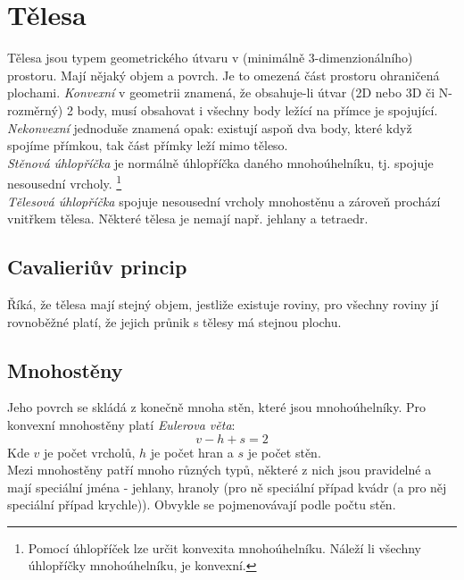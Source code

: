 \documentclass[12pt]{article}
\begin{document}
\section{Tělesa}
Tělesa jsou typem geometrického útvaru v (minimálně 3-dimenzionálního) prostoru. Mají nějaký objem a povrch. Je to omezená část prostoru ohraničená plochami. \emph{Konvexní} v geometrii znamená, že obsahuje-li útvar (2D nebo 3D či N-rozměrný) 2 body, musí obsahovat i všechny body ležící na přímce je spojující. \emph{Nekonvexní} jednoduše znamená opak: existují aspoň dva body, které když spojíme přímkou, tak část přímky leží mimo těleso.\\
\emph{Stěnová úhlopříčka} je normálně úhlopříčka daného mnohoúhelníku, tj. spojuje nesousední vrcholy. \footnote{Pomocí úhlopříček lze určit konvexita mnohoúhelníku. Náleží li všechny úhlopříčky mnohoúhelníku, je konvexní.}\\
\emph{Tělesová úhlopříčka} spojuje nesousední vrcholy mnohostěnu a zároveň prochází vnitřkem tělesa. Některé tělesa je nemají např. jehlany a tetraedr.
\subsection{Cavalieriův princip}
Říká, že tělesa mají stejný objem, jestliže existuje roviny, pro všechny roviny jí rovnoběžné platí, že jejich průnik s tělesy má stejnou plochu.
\subsection{Mnohostěny}
Jeho povrch se skládá z konečně mnoha stěn, které jsou mnohoúhelníky. Pro konvexní mnohostěny platí \emph{Eulerova věta}:
\begin{equation}
v - h + s = 2
\end{equation}
Kde $v$ je počet vrcholů, $h$ je počet hran a $s$ je počet stěn.\\
Mezi mnohostěny patří mnoho různých typů, některé z nich jsou pravidelné a mají speciální jména - jehlany, hranoly (pro ně speciální případ kvádr (a pro něj speciální případ krychle)). Obvykle se pojmenovávají podle počtu stěn.\\
\end{document}
